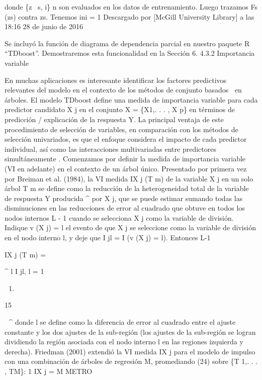 \documentclass[]{article}
\begin{document}
donde \{z ~s, i\} n son evaluados en los datos de entrenamiento. Luego
trazamos Fs (zs) contra zs. Tenemos ini = 1 Descargado por {[}McGill
University Library{]} a las 18:16 28 de junio de 2016

Se incluyó la función de diagrama de dependencia parcial en nuestro
paquete R ``TDboost''. Demostraremos esta funcionalidad en la Sección 6.
4.3.2 Importancia variable

En muchas aplicaciones es interesante identificar los factores
predictivos relevantes del modelo en el contexto de los métodos de
conjunto basados en árboles. El modelo TDboost define una medida de
importancia variable para cada predictor candidato X j en el conjunto X
= \{X1,. . . , X p\} en términos de predicción / explicación de la
respuesta Y. La principal ventaja de este procedimiento de selección de
variables, en comparación con los métodos de selección univariados, es
que el enfoque considera el impacto de cada predictor individual, así
como las interacciones multivariadas entre predictores simultáneamente .
Comenzamos por definir la medida de importancia variable (VI en
adelante) en el contexto de un árbol único. Presentado por primera vez
por Breiman et al. (1984), la VI medida IX j (T m) de la variable X j en
un solo árbol T m se define como la reducción de la heterogeneidad total
de la variable de respuesta Y producida \^{} por X j, que se puede
estimar sumando todas las disminuciones en las reducciones de error al
cuadrado que obtuve en todos los nodos internos L - 1 cuando se
selecciona X j como la variable de división. Indique v (X j) = l el
evento de que X j se seleccione como la variable de división en el nodo
interno l, y deje que I jl = I (v (X j) = l). Entonces L-1

IX j (T m) =

\^{} l I jl, l = 1

\begin{enumerate}
\def\labelenumi{(\arabic{enumi})}
\setcounter{enumi}{23}
\item
\end{enumerate}

15

 \^{} donde l se define como la diferencia de error al cuadrado entre
el ajuste constante y los dos ajustes de la sub-región (los ajustes de
la sub-región se logran dividiendo la región asociada con el nodo
interno l en las regiones izquierda y derecha). Friedman (2001) extendió
la VI medida IX j para el modelo de impulso con una combinación de
árboles de regresión M, promediando (24) sobre \{T 1,. . . , TM\}: 1 IX
j = M METRO
\end{document}
